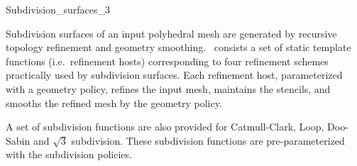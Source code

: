 
\ccRefPageBegin



\begin{ccRefClass}{Subdivision_surfaces_3}

\ccDefinition

Subdivision surfaces of an input polyhedral mesh
are generated by recursive topology refinement and geometry
smoothing. \ccClassTemplateName\ consists a set of static 
template functions (i.e.~refinement hosts) corresponding 
to four refinement schemes practically used by subdivision surfaces. 
Each refinement host, parameterized with a geometry policy,
refines the input mesh, maintains the stencils, and smooths the 
refined mesh by the geometry policy.

A set of subdivision functions are also provided  
for Catmull-Clark, Loop, Doo-Sabin and $\sqrt{3}$ subdivision.
These subdivision functions are pre-parameterized with the
subdivision policies.




\ccParameters


\end{ccRefClass}
